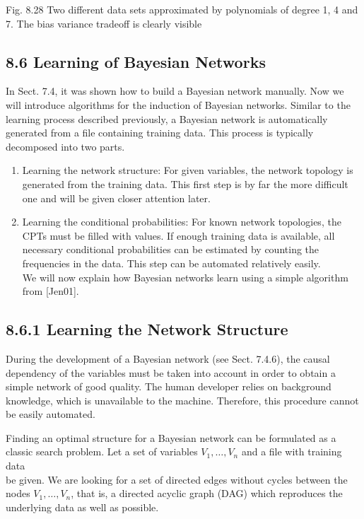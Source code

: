 \documentclass[10pt]{article}
\begin{document}
Fig. 8.28 Two different data sets approximated by polynomials of degree 1, 4 and 7. The bias variance tradeoff is clearly visible

\subsection*{8.6 Learning of Bayesian Networks}
In Sect. 7.4, it was shown how to build a Bayesian network manually. Now we will introduce algorithms for the induction of Bayesian networks. Similar to the learning process described previously, a Bayesian network is automatically generated from a file containing training data. This process is typically decomposed into two parts.

\begin{enumerate}
  \item Learning the network structure: For given variables, the network topology is generated from the training data. This first step is by far the more difficult one and will be given closer attention later.
  \item Learning the conditional probabilities: For known network topologies, the CPTs must be filled with values. If enough training data is available, all necessary conditional probabilities can be estimated by counting the frequencies in the data. This step can be automated relatively easily.\\[0pt]
We will now explain how Bayesian networks learn using a simple algorithm from [Jen01].
\end{enumerate}

\subsection*{8.6.1 Learning the Network Structure}
During the development of a Bayesian network (see Sect. 7.4.6), the causal dependency of the variables must be taken into account in order to obtain a simple network of good quality. The human developer relies on background knowledge, which is unavailable to the machine. Therefore, this procedure cannot be easily automated.

Finding an optimal structure for a Bayesian network can be formulated as a classic search problem. Let a set of variables $V_{1}, \ldots, V_{n}$ and a file with training data\\
be given. We are looking for a set of directed edges without cycles between the nodes $V_{1}, \ldots, V_{n}$, that is, a directed acyclic graph (DAG) which reproduces the underlying data as well as possible.
\end{document}
